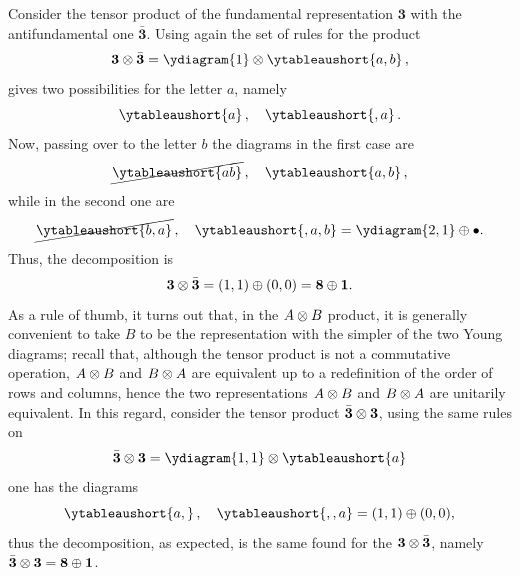\begin{ex}
    Consider the tensor product of the fundamental representation $\bm{3}$ with the antifundamental one $\bar{\bm{3}}$. Using again the set of rules for the product
    \begin{equation}
        \bm{3} \ot \bar{\bm{3}} = \ydiagram{1} \ot \ytableaushort{a,b}\,,
    \end{equation}
    gives two possibilities for the letter $a$, namely 
    \begin{equation}
        \ytableaushort{{}a}\,,\quad \ytableaushort{{},a}\,.
    \end{equation}
    Now, passing over to the letter $b$ the diagrams in the first case are
    \begin{equation}
        \cancel{\ytableaushort{{}{}ab}}\,,\quad \ytableaushort{{}a,b}\,,
    \end{equation}
    while in the second one are
    \begin{equation}
        \cancel{\ytableaushort{{}b,a}}\,,\quad \ytableaushort{{},a,b} = \ydiagram{2,1} \op \bullet.
    \end{equation}
    Thus, the decomposition is
    \begin{equation}
        \bm{3} \otimes \bar{\bm{3}} = (1,1) \oplus (0,0) = \bm{8} \oplus \bm{1}.
    \end{equation}
    As a rule of thumb, it turns out that, in the $A \otimes B$ product, it is generally convenient to take $B$ to be the representation with the simpler of the two Young diagrams; recall that, although the tensor product is not a commutative operation, $A \otimes B$ and $B \otimes A$ are equivalent up to a redefinition of the order of rows and columns, hence the two representations $A \otimes B$ and $B \otimes A$ are unitarily equivalent. In this regard, consider the tensor product $\bar{\bm{3}} \otimes \bm{3}$, using the same rules on
    \begin{equation}
        \bar{\bm{3}} \ot \bm{3} = \ydiagram{1,1} \ot \ytableaushort{a}
    \end{equation}
    one has the diagrams
    \begin{equation}
        \ytableaushort{{}a,{}}\,,\quad \ytableaushort{{},{},a} = (1,1) \op (0,0),
    \end{equation}
    thus the decomposition, as expected, is the same found for the $\bm{3} \otimes \bar{\bm{3}}$, namely $\bar{\bm{3}} \otimes \bm{3} = \bm{8} \oplus \bm{1}$.
\end{ex}
